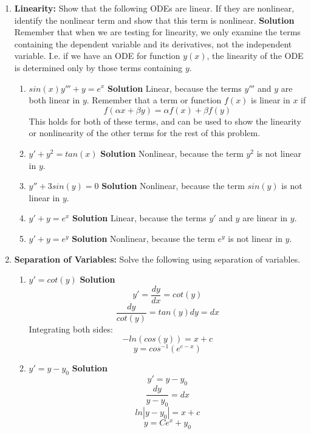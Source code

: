 \documentclass[letterpaper, fontsize=11pt]{scrartcl} %
\numberwithin{equation}{section} %
\numberwithin{figure}{section} %
\numberwithin{table}{section} %
\begin{document}
\begin{enumerate}
\item \textbf{Linearity:} Show that the following ODEs are linear. If they are nonlinear, identify the nonlinear term and show that this term is nonlinear. \newline
\textbf{Solution} \newline Remember that when we are testing for linearity, we only examine the terms containing the dependent variable and its derivatives, not the independent variable. I.e. if we have an ODE for function $y(x)$, the linearity of the ODE is determined only by those terms containing $y$.
\begin{enumerate}
\item $sin(x)y''' + y = e^x$\newline
\textbf{Solution} Linear, because the terms $y'''$ and $y$ are both linear in $y$. Remember that a term or function $f(x)$ is linear in $x$ if
$$f(\alpha x + \beta y) = \alpha f(x) + \beta f(y)$$ This holds for both of these terms, and can be used to show the linearity or nonlinearity of the other terms for the rest of this problem. 
\item $y' + y^2 = tan(x)$\newline
\textbf{Solution} Nonlinear, because the term $y^2$ is not linear in $y$.
\item $y'' + 3sin(y) = 0$ \newline
\textbf{Solution} Nonlinear, because the term $sin(y)$ is not linear in $y$.
\item $y' + y = e^x$ \newline
\textbf{Solution} Linear, because the terms $y'$ and $y$ are linear in $y$.
\item $y' + y = e^y$ \newline
\textbf{Solution} Nonlinear, because the term $e^y$ is not linear in $y$.
\end{enumerate}

\item \textbf{Separation of Variables:} Solve the following using separation of variables. 
\begin{enumerate}
\item $y' = cot(y)$ \newline
\textbf{Solution} 
$$y' = \frac{dy}{dx} = cot(y)$$
$$\frac{dy}{cot(y)} = tan(y)dy = dx$$
Integrating both sides: $$ -ln(cos(y)) = x + c$$
$$y = cos^{-1}(e^{c-x})$$

\item $y' = y - y_0$
\textbf{Solution}
$$y' = y - y_0$$
$$\frac{dy}{y-y_0} = dx $$
$$ln|y-y_0| = x + c$$
$$y = Ce^x + y_0$$


\end{enumerate}
\end{enumerate}
\end{document}
